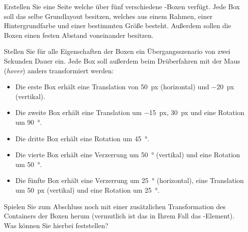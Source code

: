 %
\par Erstellen Sie eine Seite welche über fünf verschiedene -Boxen
verfügt. Jede Box soll das selbe Grundlayout besitzen, welches aus einem
Rahmen, einer Hintergrundfarbe und einer bestimmten Größe besteht. Außerdem
sollen die Boxen einen festen Abstand voneinander besitzen.
%
\par Stellen Sie für alle Eigenschaften der Boxen ein Übergangsszenario von
zwei Sekunden Dauer ein. Jede Box soll außerdem beim Drüberfahren mit der Maus
(\emph{hover}) anders transformiert werden:
%
\begin{itemize}
\item
Die erste Box erhält eine Translation von \qty{50}{px} (horizontal) und
\qty{-20}{px} (vertikal).
\item
Die zweite Box erhält eine Translation um \qty{-15}{px}, \qty{30}{px} und eine
Rotation um \qty{90}{\degree}.
\item
Die dritte Box erhält eine Rotation um \qty{45}{\degree}.
\item
Die vierte Box erhält eine Verzerrung um \qty{50}{\degree} (vertikal) und eine
Rotation um \qty{50}{\degree}.
\item
Die fünfte Box erhält eine Verzerrung um \qty{25}{\degree} (horizontal), eine
Translation um \qty{50}{px} (vertikal) und eine Rotation um \qty{25}{\degree}.
\end{itemize}
%
\par Spielen Sie zum Abschluss noch mit einer zusätzlichen Transformation des
Containers der Boxen herum (vermutlich ist das in Ihrem Fall das
-Element). Was können Sie hierbei feststellen?